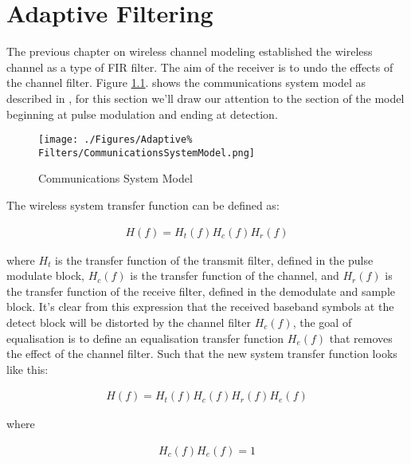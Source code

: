 \chapter{Adaptive Filtering}
\label{chap:AdaptiveFiltering}
The previous chapter on wireless channel modeling established %
the wireless channel as a type of FIR filter. The aim of the %
receiver is to undo the effects of the channel filter. %
Figure \ref{fig:CommSysModel}. shows the communications %
system model as described in \cite{Sklar01}, for this section %
we'll draw our attention to the section of the model beginning %
at pulse modulation and ending at detection. 

\begin{figure}[h!]
	\texttt{[image: ./Figures/Adaptive\%
		Filters/CommunicationsSystemModel.png]}
	\caption{Communications System Model \cite{Sklar01}}
	\label{fig:CommSysModel}
\end{figure}

The wireless system transfer function can be defined as:

\begin{align}
	H(f) = H_{t}(f)H_{c}(f)H_{r}(f)
\end{align}

where $H_{t}$ is the transfer function of the transmit filter, 
defined in the pulse modulate block, %
$H_{c}(f)$ is the transfer function of the channel, and $H_{r}%
(f)$ is the transfer function of the receive filter, defined in %
the demodulate and sample block. It's clear from this %
expression that the received baseband symbols at the %
detect block will be distorted by the channel filter $H_{c}%
(f)$, the goal of equalisation is to define an equalisation %
transfer function $H_{e}(f)$ that removes the effect of %
the channel filter. Such that the new system transfer %
function looks like this:

\begin{align}
	H(f) = H_{t}(f)H_{c}(f)H_{r}(f)H_{e}(f)
\end{align}

where

\begin{align}
	H_{c}(f)H_{e}(f) = 1
\end{align}





